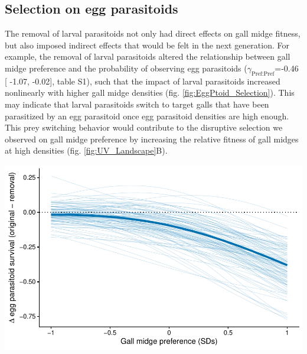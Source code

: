 \documentclass[11pt,]{article}
\let\origfigure\figure
\let\endorigfigure\endfigure
\renewenvironment{figure}[1][2] {
    \expandafter\origfigure\expandafter[H]
} {
    \endorigfigure
}
\begin{document}
\bigskip

\subsection{Selection on egg
parasitoids}\label{selection-on-egg-parasitoids}

The removal of larval parasitoids not only had direct effects on gall
midge fitness, but also imposed indirect effects that would be felt in
the next generation. For example, the removal of larval parasitoids
altered the relationship between gall midge preference and the
probability of observing egg parasitoids
(\(\gamma_{\text{Pref:Pref}}\)=-0.46 {[} -1.07, -0.02{]}, table S1),
such that the impact of larval parasitoids increased nonlinearly with
higher gall midge densities (fig. \ref{fig:EggPtoid_Selection}). This
may indicate that larval parasitoids switch to target galls that have
been parasitized by an egg parasitoid once egg parasitoid densities are
high enough. This prey switching behavior would contribute to the
disruptive selection we observed on gall midge preference by increasing
the relative fitness of gall midges at high densities (fig.
\ref{fig:UV_Landscape}B).

\bigskip

\begin{figure}
\centering
\includegraphics{../analyses/selection_on_Platygaster.pdf}
\caption{\label{fig:EggPtoid_Selection}Selection imposed by larval
parasitoids on egg parasitoids (\emph{Platygaster} sp.). The bold line
represents the average difference in the probability of observing the
egg parasitoid (original minus removal of larval parastioids) as a
function of gall midge oviposition preference. Thin lines represent
bootstrapped replicates to show the uncertainty in selection. For
clarity, we only display 100 bootstraps even though inferences are based
on 1,000 replicates. The decrease in the probability of observing egg
parasitoids at high gall-midge densities indicate that larval
parasitoids impose nonlinear selection on egg parasitoids.}
\end{figure}
\end{document}
